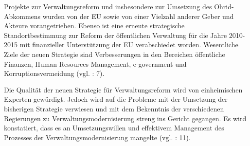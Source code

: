 Projekte zur Verwaltungsreform und insbesondere zur Umsetzung des Ohrid-Abkommens wurden von der EU sowie von einer Vielzahl anderer Geber und Akteure vorangetrieben. Ebenso ist eine erneute strategische Standortbestimmung zur Reform der öffentlichen Verwaltung für die Jahre 2010-2015 mit finanzieller Unterstützung der EU verabschiedet worden. Wesentliche Ziele der neuen Strategie sind Verbesserungen in den Bereichen öffentliche Finanzen, Human Resources Management, e-government und Korruptionsvermeidung (vgl. \cite{dimeski} : 7). \par
Die Qualität der neuen Strategie für Verwaltungsreform wird von einheimischen Experten gewürdigt. Jedoch wird auf die Probleme mit der Umsetzung der bisherigen Strategie verwiesen und mit dem Bekenntnis der verschiedenen Regierungen zu Verwaltungsmodernisierung streng ins Gericht gegangen. Es wird konstatiert, dass es an Umsetzungswillen und effektivem Management des Prozesses der Verwaltungsmodernisierung mangelte (vgl. \cite{dimeski} : 11).

